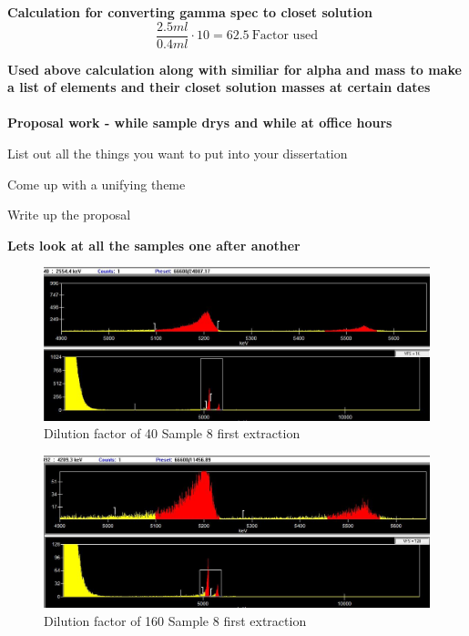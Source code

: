 \documentclass[idxtotoc,hyperref,openany,oneside]{labbook} %
\begin{document}
\textbf{Calculation for converting gamma spec to closet solution}
\begin{equation*}
\frac{2.5ml}{0.4ml}\cdot10=62.5\ \text{Factor used}
\end{equation*}

\textbf{Used above calculation along with similiar for alpha and mass to make a list
  of elements and their closet solution masses at certain dates}\\~\\

\textbf{Proposal work - while sample drys and while at office hours}
\begin{todolist}
\item{List out all the things you want to put into your dissertation}
\item{Come up with a unifying theme}
\item{Write up the proposal}
\end{todolist}









\textbf{Lets look at all the samples one after another}


\begin{figure}[H] %
\begin{center}
\includegraphics[width=0.9\linewidth]{Figures/Dilution1_Sample8}
\end{center}
\caption{Dilution factor of 40 Sample 8 first extraction}
\label{fig:example_figure}
\end{figure}

\begin{figure}[H] %
\begin{center}
\includegraphics[width=0.9\linewidth]{Figures/Dilution2_Sample8}
\end{center}
\caption{Dilution factor of 160 Sample 8 first extraction}
\label{fig:example_figure}
\end{figure}
\end{document}
